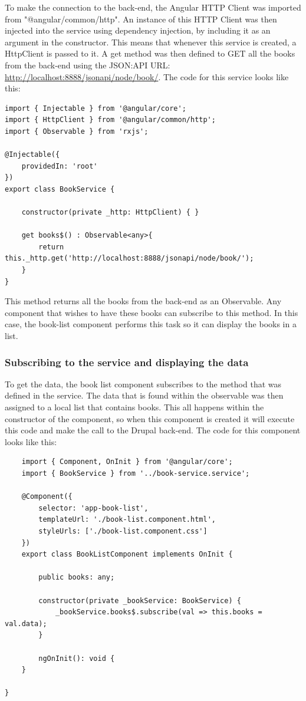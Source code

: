 To make the connection to the back-end, the Angular HTTP Client was imported from "@angular/common/http". An instance of this HTTP Client was then injected into the service using dependency injection, by including it as an argument in the constructor. This means that whenever this service is created, a HttpClient is passed to it. A get method was then defined to GET all the books from the back-end using the JSON:API URL: \url{http://localhost:8888/jsonapi/node/book/}. The code for this service looks like this: 


\begin{lstlisting}
import { Injectable } from '@angular/core';
import { HttpClient } from '@angular/common/http';
import { Observable } from 'rxjs';
	
@Injectable({
	providedIn: 'root'
})
export class BookService {
		
	constructor(private _http: HttpClient) { }
		
	get books$() : Observable<any>{
		return this._http.get('http://localhost:8888/jsonapi/node/book/');
	}
}
\end{lstlisting}

This method returns all the books from the back-end as an Observable. Any component that wishes to have these books can subscribe to this method. In this case, the book-list component performs this task so it can display the books in a list.

\subsubsection{Subscribing to the service and displaying the data}

To get the data, the book list component subscribes to the method that was defined in the service. The data that is found within the observable was then assigned to a local list that contains books. This all happens within the constructor of the component, so when this component is created it will execute this code and make the call to the Drupal back-end. The code for this component looks like this:

\begin{lstlisting}
	import { Component, OnInit } from '@angular/core';
	import { BookService } from '../book-service.service';

	@Component({
		selector: 'app-book-list',
		templateUrl: './book-list.component.html',
		styleUrls: ['./book-list.component.css']
	})
	export class BookListComponent implements OnInit {
	
		public books: any;
	
		constructor(private _bookService: BookService) {
			_bookService.books$.subscribe(val => this.books = val.data);
		}
	
		ngOnInit(): void {
	}
	
}
\end{lstlisting}

